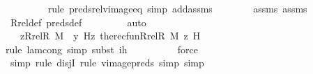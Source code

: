 \begin{isabellebody}
\ \ \ \ \ \ \ \ \isamarkupfalse%
{\isacharparenleft}{\kern0pt}rule\ preds{\isacharunderscore}{\kern0pt}rel{\isacharunderscore}{\kern0pt}vimage{\isacharunderscore}{\kern0pt}eq{\isacharcomma}{\kern0pt}\ simp\ add{\isacharcolon}{\kern0pt}assms{\isacharparenright}{\kern0pt}\isanewline
\ \ \ \ \ \ \isamarkupfalse%
\ assms\ assms{}\isanewline
\ \ \ \ \ \ \isamarkupfalse%
\ Rrel{\isacharunderscore}{\kern0pt}def\ preds{\isacharunderscore}{\kern0pt}def\ \isanewline
\ \ \ \ \ \ \isamarkupfalse%
\ auto\ \isanewline
\ \ \ \ \isamarkupfalse%
\ \isamarkupfalse%
\ {\isachardoublequoteopen}{\isachardot}{\kern0pt}{\isachardot}{\kern0pt}{\isachardot}{\kern0pt}\ {\isacharequal}{\kern0pt}\ {\isacharparenleft}{\kern0pt}{\isasymlambda}z{\isasymin}Rrel{\isacharparenleft}{\kern0pt}R{\isacharcomma}{\kern0pt}\ M{\isacharparenright}{\kern0pt}\ {\isacharminus}{\kern0pt}{\isacharbackquote}{\kern0pt}{\isacharbackquote}{\kern0pt}\ {\isacharbraceleft}{\kern0pt}y{\isacharbraceright}{\kern0pt}{\isachardot}{\kern0pt}\ H{\isacharparenleft}{\kern0pt}z{\isacharcomma}{\kern0pt}\ the{\isacharunderscore}{\kern0pt}recfun{\isacharparenleft}{\kern0pt}Rrel{\isacharparenleft}{\kern0pt}R{\isacharcomma}{\kern0pt}\ M{\isacharparenright}{\kern0pt}{\isacharcomma}{\kern0pt}\ z{\isacharcomma}{\kern0pt}\ H{\isacharparenright}{\kern0pt}{\isacharparenright}{\kern0pt}{\isacharparenright}{\kern0pt}{\isachardoublequoteclose}\isanewline
\ \ \ \ \ \ \isamarkupfalse%
{\isacharparenleft}{\kern0pt}rule\ lam{\isacharunderscore}{\kern0pt}cong{\isacharcomma}{\kern0pt}\ simp{\isacharcomma}{\kern0pt}\ subst\ ih{\isacharparenright}{\kern0pt}\isanewline
\ \ \ \ \ \ \ \ \isamarkupfalse%
\ force\ \isanewline
\ \ \ \ \ \ \ \isamarkupfalse%
\ {\isacharparenleft}{\kern0pt}simp{\isacharcomma}{\kern0pt}\ rule\ disjI{}{\isacharcomma}{\kern0pt}\ rule\ vimage{\isacharunderscore}{\kern0pt}preds{\isacharcomma}{\kern0pt}\ simp{\isacharcomma}{\kern0pt}\ simp{\isacharparenright}{\kern0pt}\isanewline
\ \ \ \ \ \ \isamarkupfalse%
\isanewline
\ \ \ \ \isamarkupfalse%
\ \isamarkupfalse%

\end{isabellebody}
